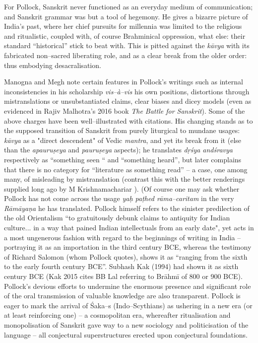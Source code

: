 For Pollock, Sanskrit never functioned as an everyday medium of communication; and Sanskrit grammar was but a tool of hegemony. He gives a bizarre picture of India’s past, where her chief pursuits for millennia was limited to the religious and ritualistic, coupled with, of course Brahminical oppression, what else: their standard “historical” stick to beat with. This is pitted against the \textit{kāvya} with its fabricated non–sacred liberating role, and as a clear break from the older order: thus embodying desacralisation.

Manogna and Megh note certain features in Pollock’s writings such as internal inconsistencies in his scholarship \textit{vis–à–vis} his own positions, distortions through mistranslations or unsubstantiated claims, clear biases and dicey models (even as evidenced in Rajiv Malhotra’s 2016 book \textit{The Battle for Sanskrit}). Some of the above charges have been well–illustrated with citations. His changing stands as to the supposed transition of Sanskrit from purely liturgical to mundane usages: \textit{kāvya} as a "direct descendent" of Vedic \textit{mantra}, and yet its break from it (else than the \textit{apauruṣeya} and \textit{pauruṣeya} aspects); he translates \textit{dṛśya andśravya} respectively as “something seen “ and “something heard”, but later complains that there is no category for “literature as something read” – a case, one among many, of misleading by mistranslation (contrast this with the better renderings supplied long ago by M Krishnamachariar ). (Of course one may ask whether Pollock has not come across the usage \textit{yaḥ paṭhed rāma–caritam} in the very \textit{Rāmāyaṇa} he has translated. Pollock himself refers to the sinister predilection of the old Orientalism “to gratuitously debunk claims to antiquity for Indian culture... in a way that pained Indian intellectuals from an early date", yet acts in a most ungenerous fashion with regard to the beginnings of writing in India – portraying it as an importation in the third century BCE, whereas the testimony of Richard Salomon (whom Pollock quotes), shows it as “ranging from the sixth to the early fourth century BCE”. Subhash Kak (1994) had shown it as sixth century BCE (Kak 2015 cites BB Lal referring to Brāhmī of 800 or 900 BCE). Pollock’s devious efforts to undermine the enormous presence and significant role of the oral transmission of valuable knowledge are also transparent. Pollock is eager to mark the arrival of Śaka–s (Indo–Scythians) as ushering in a new era (or at least reinforcing one) – a cosmopolitan era, whereafter ritualisation and monopolisation of Sanskrit gave way to a new sociology and politicisation of the language – all conjectural superstructures erected upon conjectural foundations.


